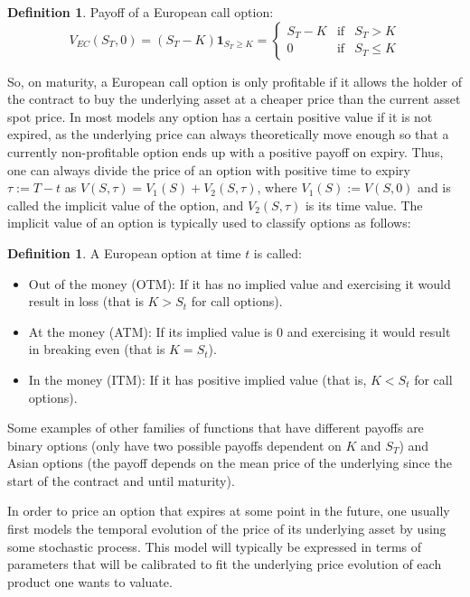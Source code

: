 \documentclass[12,twoside]{mammeTFM}
\theoremstyle{definition}
\newtheorem{definition}[thm]{Definition}
\theoremstyle{remark}
\begin{document}
\begin{definition} Payoff of a European call option:
\begin{equation} \label{eq:european_call_payoff}
V_{EC}(S_T, 0) = (S_T - K)\boldsymbol{1}_{S_T \geq K} = \left\{ \begin{array}{rcl}
S_T - K & \mbox{if} & S_T > K \\ 
0 & \mbox{if} & S_T\leq K
\end{array}\right.
\end{equation} 
\end{definition}

So, on maturity, a European call option is only profitable if it allows the holder of the contract to buy the underlying asset at a cheaper price than the current asset spot price. In most models any option has a certain positive value if it is not expired, as the underlying price can always theoretically move enough so that a currently non-profitable option ends up with a positive payoff on expiry. Thus, one can always divide the price of an option with positive time to expiry $\tau := T - t$ as $V(S,\tau) = V_1(S) + V_2(S, \tau)$, where $V_1(S) := V(S,0)$ and is called the implicit value of the option, and $V_2(S, \tau)$ is its time value. The implicit value of an option is typically used to classify options as follows:

\begin{definition} A European option at time $t$ is called:
\begin{itemize}
\item {Out of the money (OTM):} If it has no implied value and exercising it would result in loss (that is $K > S_t$ for call options).
\item {At the money (ATM):} If its implied value is 0 and exercising it would result in breaking even (that is $K = S_t$).
\item {In the money (ITM):} If it has positive implied value (that is, $K < S_t$ for call options).
\end{itemize}

\end{definition}

Some examples of other families of functions that have different payoffs are binary options (only have two possible payoffs dependent on $K$ and $S_T$) and Asian options (the payoff depends on the mean price of the underlying since the start of the contract and until maturity).

In order to price an option that expires at some point in the future, one usually first models the temporal evolution of the price of its underlying asset by using some stochastic process. This model will typically be expressed in terms of parameters that will be calibrated to fit the underlying price evolution of each product one wants to valuate.
\end{document}

